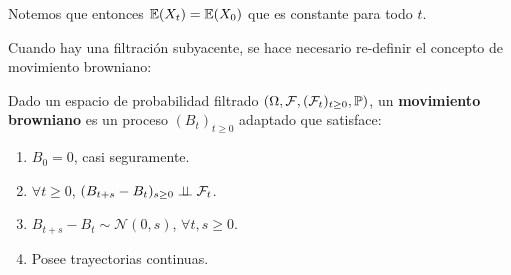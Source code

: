 Notemos que entonces $\E(X_t) = \E(X_0)$ que es constante para todo $t$. 

\iffalse  %
\newp El concepto de martingala está 
íntimamente relacionado con el calculo de esperanzas condicionales. A continuación se revisan algunas 
de las propiedades  necesarias en cuanto a este último concepto. 

\newp Si $X$ es una variable aleatoria y $\mathcal{G}$ es una sub $\sigma$ - álgebra, $Y = \E(X \mid \mathcal{G})$ 
es la única (casi seguramente) variable aleatoria $\mathcal{G}$-medible tal que 
\begin{equation*}
\E \left( \mathbbm{1}_{A} X  \right)  = \E\left( \mathbbm{1}_{A} T \right) , ~ ~ ~\forall  A \in \mathcal{G}
\end{equation*}

\begin{itemize}
        \item Si $X$ es $\mathcal{G}$- medible, entonces $\E(E \mid \mathcal{G} ) = X$ casi seguramente.
        \item Si $X \indep \mathcal{G}$, entonces $\E(X \mid \mathcal{G}) =
                \E (X)$, es decir, es constante casi seguramente.
        \item Si $Z$ es $\mathcal{G}$ - medible, entonces $\E(ZX \mid G) = Z\E(X \mid \mathcal{G})$ casi 
                seguramente.
\end{itemize}
\fi

\newp Cuando hay una filtración subyacente, se hace necesario re-definir el concepto de movimiento browniano:

\begin{definition}
Dado un espacio de probabilidad filtrado $(\Omega, \mathcal{F}, (\mathcal{F}_t)_{t \geq 0}, \P)$, un \textbf{movimiento browniano} es un proceso $(B_t)_{t\geq 0}$ adaptado que satisface:
\renewcommand{\labelenumi}{\roman{enumi})}
\begin{enumerate}
        \item   $B_0 = 0$, casi seguramente. 
        \item $\forall t \geq 0$, $(B_{t+s} - B_t)_{s \geq 0} \indep \mathcal{F}_t$. 
        \item $B_{t+s} - B_t \sim  \mathcal{N}(0,s)$, $\forall t,s \geq 0$. 
        \item Posee trayectorias continuas. 
\end{enumerate}
\end{definition}

